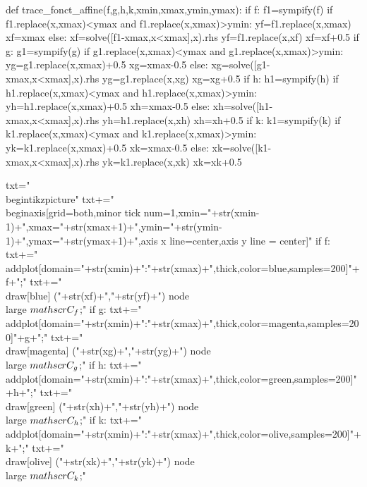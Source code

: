 \begin{pycode}

def trace_fonct_affine(f,g,h,k,xmin,xmax,ymin,ymax):
    if f:
        f1=sympify(f)
        if f1.replace(x,xmax)<ymax and f1.replace(x,xmax)>ymin:
            yf=f1.replace(x,xmax)
            xf=xmax
        else:
            xf=solve([f1-xmax,x<xmax],x).rhs
            yf=f1.replace(x,xf)
            xf=xf+0.5
    if g:
        g1=sympify(g)
        if g1.replace(x,xmax)<ymax and g1.replace(x,xmax)>ymin:
            yg=g1.replace(x,xmax)+0.5
            xg=xmax-0.5
        else:
            xg=solve([g1-xmax,x<xmax],x).rhs
            yg=g1.replace(x,xg)
            xg=xg+0.5
    if h:
        h1=sympify(h)
        if h1.replace(x,xmax)<ymax and h1.replace(x,xmax)>ymin:
            yh=h1.replace(x,xmax)+0.5
            xh=xmax-0.5
        else:
            xh=solve([h1-xmax,x<xmax],x).rhs
            yh=h1.replace(x,xh)
            xh=xh+0.5
    if k:
        k1=sympify(k)
        if k1.replace(x,xmax)<ymax and k1.replace(x,xmax)>ymin:
            yk=k1.replace(x,xmax)+0.5
            xk=xmax-0.5
        else:
            xk=solve([k1-xmax,x<xmax],x).rhs
            yk=k1.replace(x,xk)
            xk=xk+0.5

    txt="\\begin{tikzpicture}"
    txt+="\\begin{axis}[grid=both,minor tick num=1,xmin="+str(xmin-1)+",xmax="+str(xmax+1)+",ymin="+str(ymin-1)+",ymax="+str(ymax+1)+",axis x line=center,axis y line = center]"
    if f:
        txt+="\\addplot[domain="+str(xmin)+":"+str(xmax)+",thick,color=blue,samples=200]{"+f+"};"
        txt+="\\draw[blue] ("+str(xf)+","+str(yf)+") node {\\large $\\mathscr{C}_f$};"
    if g:
        txt+="\\addplot[domain="+str(xmin)+":"+str(xmax)+",thick,color=magenta,samples=200]{"+g+"};"
        txt+="\\draw[magenta] ("+str(xg)+","+str(yg)+") node {\\large $\\mathscr{C}_g$};"
    if h:
        txt+="\\addplot[domain="+str(xmin)+":"+str(xmax)+",thick,color=green,samples=200]{"+h+"};"
        txt+="\\draw[green] ("+str(xh)+","+str(yh)+") node {\\large $\\mathscr{C}_h$};"
    if k:
        txt+="\\addplot[domain="+str(xmin)+":"+str(xmax)+",thick,color=olive,samples=200]{"+k+"};"
        txt+="\\draw[olive] ("+str(xk)+","+str(yk)+") node {\\large $\\mathscr{C}_k$};"


\end{pycode}
